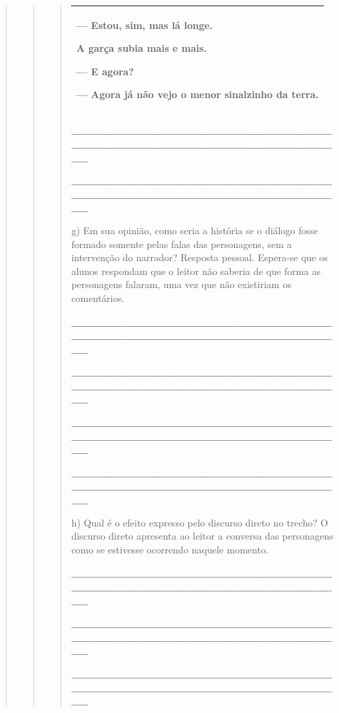 \begin{quote}
\begin{quote}
\begin{quote}
\begin{longtable}[]{@{}l@{}}
\begin{minipage}[t]{0.97\columnwidth}
--- Estou, sim, mas lá longe.

A garça subia mais e mais.

--- E agora?

--- Agora já não vejo o menor sinalzinho da terra.\strut
\end{minipage}\tabularnewline
\bottomrule
\end{longtable}

\protect\hypertarget{_Hlk127806075}{}{}\textbf{\_\_\_\_\_\_\_\_\_\_\_\_\_\_\_\_\_\_\_\_\_\_\_\_\_\_\_\_\_\_\_\_\_\_\_\_\_\_\_\_\_\_\_\_\_\_\_\_\_\_\_\_\_\_\_\_\_\_\_\_\_\_\_\_}

\textbf{\_\_\_\_\_\_\_\_\_\_\_\_\_\_\_\_\_\_\_\_\_\_\_\_\_\_\_\_\_\_\_\_\_\_\_\_\_\_\_\_\_\_\_\_\_\_\_\_\_\_\_\_\_\_\_\_\_\_\_\_\_\_\_\_}

g) Em sua opinião, como seria a história se o diálogo fosse formado
somente pelas falas das personagens, sem a intervenção do narrador?
Resposta pessoal. Espera-se que os alunos respondam que o leitor não
saberia de que forma as personagens falaram, uma vez que não existiriam
os comentários.

\textbf{\_\_\_\_\_\_\_\_\_\_\_\_\_\_\_\_\_\_\_\_\_\_\_\_\_\_\_\_\_\_\_\_\_\_\_\_\_\_\_\_\_\_\_\_\_\_\_\_\_\_\_\_\_\_\_\_\_\_\_\_\_\_\_\_}

\textbf{\_\_\_\_\_\_\_\_\_\_\_\_\_\_\_\_\_\_\_\_\_\_\_\_\_\_\_\_\_\_\_\_\_\_\_\_\_\_\_\_\_\_\_\_\_\_\_\_\_\_\_\_\_\_\_\_\_\_\_\_\_\_\_\_}

\textbf{\_\_\_\_\_\_\_\_\_\_\_\_\_\_\_\_\_\_\_\_\_\_\_\_\_\_\_\_\_\_\_\_\_\_\_\_\_\_\_\_\_\_\_\_\_\_\_\_\_\_\_\_\_\_\_\_\_\_\_\_\_\_\_\_}

\textbf{\_\_\_\_\_\_\_\_\_\_\_\_\_\_\_\_\_\_\_\_\_\_\_\_\_\_\_\_\_\_\_\_\_\_\_\_\_\_\_\_\_\_\_\_\_\_\_\_\_\_\_\_\_\_\_\_\_\_\_\_\_\_\_\_}

h) Qual é o efeito expresso pelo discurso direto no trecho? O discurso
direto apresenta ao leitor a conversa das personagens como se estivesse
ocorrendo naquele momento.

\textbf{\_\_\_\_\_\_\_\_\_\_\_\_\_\_\_\_\_\_\_\_\_\_\_\_\_\_\_\_\_\_\_\_\_\_\_\_\_\_\_\_\_\_\_\_\_\_\_\_\_\_\_\_\_\_\_\_\_\_\_\_\_\_\_\_}

\protect\hypertarget{_Hlk127808036}{}{}\textbf{\_\_\_\_\_\_\_\_\_\_\_\_\_\_\_\_\_\_\_\_\_\_\_\_\_\_\_\_\_\_\_\_\_\_\_\_\_\_\_\_\_\_\_\_\_\_\_\_\_\_\_\_\_\_\_\_\_\_\_\_\_\_\_\_}

\textbf{\_\_\_\_\_\_\_\_\_\_\_\_\_\_\_\_\_\_\_\_\_\_\_\_\_\_\_\_\_\_\_\_\_\_\_\_\_\_\_\_\_\_\_\_\_\_\_\_\_\_\_\_\_\_\_\_\_\_\_\_\_\_\_\_}


\end{quote}
\end{quote}
\end{quote}
